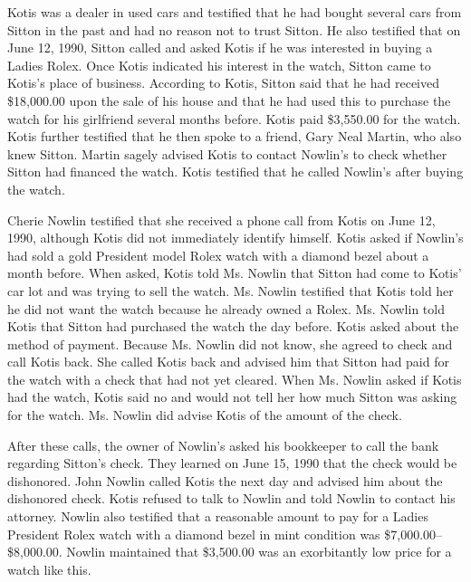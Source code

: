 Kotis was a dealer in used cars and testified that he had bought several cars
from Sitton in the past and had no reason not to trust Sitton. He also
testified that on June 12, 1990, Sitton called and asked Kotis if he was
interested in buying a Ladies Rolex. Once Kotis indicated his interest in the
watch, Sitton came to Kotis's place of business. According to Kotis, Sitton
said that he had received \$18,000.00 upon the sale of his house and that he
had used this to purchase the watch for his girlfriend several months before.
Kotis paid \$3,550.00 for the watch. Kotis further testified that he then spoke
to a friend, Gary Neal Martin, who also knew Sitton. Martin sagely advised
Kotis to contact Nowlin's to check whether Sitton had financed the watch. Kotis
testified that he called Nowlin's after buying the watch.

Cherie Nowlin testified that she received a phone call from Kotis on June 12,
1990, although Kotis did not immediately identify himself. Kotis asked if
Nowlin's had sold a gold President model Rolex watch with a diamond bezel about
a month before. When asked, Kotis told Ms. Nowlin that Sitton had come to
Kotis' car lot and was trying to sell the watch. Ms. Nowlin testified that
Kotis told her he did not want the watch because he already owned a Rolex. Ms.
Nowlin told Kotis that Sitton had purchased the watch the day before. Kotis
asked about the method of payment. Because Ms. Nowlin did not know, she agreed
to check and call Kotis back. She called Kotis back and advised him that Sitton
had paid for the watch with a check that had not yet cleared. When Ms. Nowlin
asked if Kotis had the watch, Kotis said no and would not tell her how much
Sitton was asking for the watch. Ms. Nowlin did advise Kotis of the amount of
the check.

After these calls, the owner of Nowlin's asked his bookkeeper to call the bank
regarding Sitton's check. They learned on June 15, 1990 that the check would be
dishonored. John Nowlin called Kotis the next day and advised him about the
dishonored check. Kotis refused to talk to Nowlin and told Nowlin to contact
his attorney. Nowlin also testified that a reasonable amount to pay for a
Ladies President Rolex watch with a diamond bezel in mint condition was
\$7,000.00--\$8,000.00. Nowlin maintained that \$3,500.00 was an exorbitantly
low price for a watch like this.

